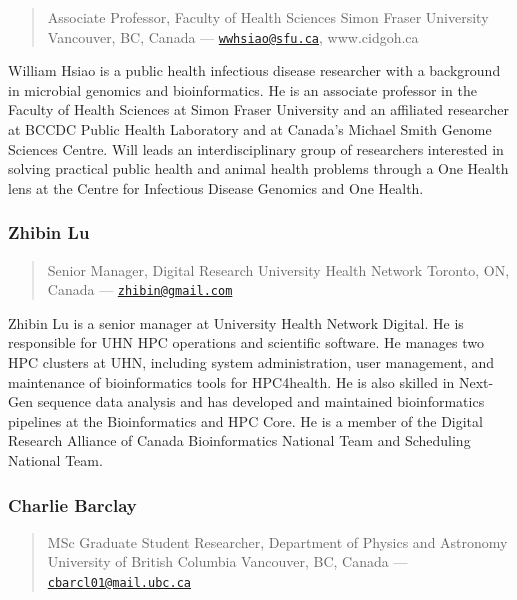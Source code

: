 \documentclass[
]{book}
\begin{document}
\begin{quote}
Associate Professor, Faculty of Health Sciences Simon Fraser
University Vancouver, BC, Canada ---
\href{mailto:wwhsiao@sfu.ca}{\nolinkurl{wwhsiao@sfu.ca}}, www.cidgoh.ca
\end{quote}

William Hsiao is a public health infectious disease researcher with a
background in microbial genomics and bioinformatics. He is an associate
professor in the Faculty of Health Sciences at Simon Fraser University
and an affiliated researcher at BCCDC Public Health Laboratory and at
Canada's Michael Smith Genome Sciences Centre. Will leads an
interdisciplinary group of researchers interested in solving practical
public health and animal health problems through a One Health lens at
the Centre for Infectious Disease Genomics and One Health.

\subsubsection{Zhibin Lu}\label{zhibin-lu}

\begin{quote}
Senior Manager, Digital Research University Health Network
Toronto, ON, Canada ---
\href{mailto:zhibin@gmail.com}{\nolinkurl{zhibin@gmail.com}}
\end{quote}

Zhibin Lu is a senior manager at University Health Network Digital. He is responsible for UHN HPC operations and scientific software. He manages two HPC clusters at UHN, including system administration, user management, and maintenance of bioinformatics tools for HPC4health. He is also skilled in Next-Gen sequence data analysis and has developed and maintained bioinformatics pipelines at the Bioinformatics and HPC Core. He is a member of the Digital Research Alliance of Canada Bioinformatics National Team and Scheduling National Team.

\subsubsection{Charlie Barclay}\label{charlie-barclay}

\begin{quote}
MSc Graduate Student Researcher, Department of Physics and Astronomy
University of British Columbia Vancouver, BC, Canada ---
\href{mailto:cbarcl01@mail.ubc.ca}{\nolinkurl{cbarcl01@mail.ubc.ca}}
\end{quote}
\end{document}
